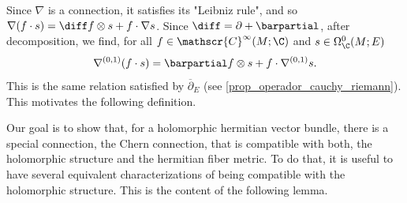 \begin{obs} \label{nabla01_is_Dolbeault_operator}
    Since \(\nabla\) is a connection, it satisfies its "Leibniz rule", and so \(\nabla(f\cdot s)=\diff  f \otimes s+f\cdot \nabla s\). Since \(\diff=\partial + \barpartial\), after decomposition, we find, for all \(f \in \mathscr{C}^\infty(M;\C)\) and \(s \in \Omega_\C^{0}(M;E)\)
    \[
    \nabla^{(0,1)}(f\cdot s)= \barpartial f \otimes s+f\cdot \nabla^{(0,1)} s.
    \]
    This is the same relation satisfied by \(\overline{\partial}_E\) (see \eqref{prop_operador_cauchy_riemann}). This motivates the following definition.
\end{obs}


Our goal is to show that, for a holomorphic hermitian vector bundle, there is a special connection, the Chern connection, that is compatible with both, the holomorphic structure and the hermitian fiber metric. To do that, it is useful to have several equivalent characterizations of being compatible with the holomorphic structure. This is the content of the following lemma.

